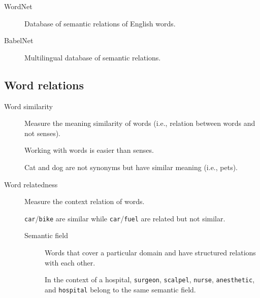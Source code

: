 \begin{description}
    \item[WordNet] 
        Database of semantic relations of English words.

    \item[BabelNet] 
        Multilingual database of semantic relations.
\end{description}


\subsection{Word relations}

\begin{description}
    \item[Word similarity] 
        Measure the meaning similarity of words (i.e., relation between words and not senses).

        \begin{remark}
            Working with words is easier than senses.
        \end{remark}

        \begin{example}
            Cat and dog are not synonyms but have similar meaning (i.e., pets).
        \end{example}

    \item[Word relatedness] 
        Measure the context relation of words.

        \begin{example}
            \texttt{car}/\texttt{bike} are similar while \texttt{car}/\texttt{fuel} are related but not similar.
        \end{example}

        \begin{description}
            \item[Semantic field] 
                Words that cover a particular domain and have structured relations with each other.

                \begin{example}
                    In the context of a hospital, \texttt{surgeon}, \texttt{scalpel}, \texttt{nurse}, \texttt{anesthetic}, and \texttt{hospital} belong to the same semantic field.
                \end{example}


\end{description}
\end{description}
